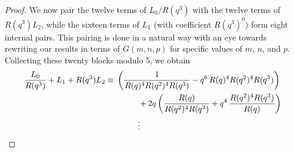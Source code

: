 \documentclass{amsart}
\theoremstyle{definition}
\def\myalpha{R(q)}
\def\mybeta{R(q^2)}
\def\mygamma{R(q^3)}
\begin{document}
\begin{proof}
We now pair the twelve terms of $L_0/\mygamma$ with the twelve terms of
$\mygamma L_2$, while the sixteen terms of $L_1$ (with coefficient $\mygamma^0$) form eight internal pairs. This pairing is done in a natural way with an eye towards rewriting our results in terms of $G(m,n,p)$ for specific values of $m$, $n$, and $p$. Collecting these twenty blocks modulo 5, we obtain
\begin{align}
\label{initial_pairings} 
\frac{L_0}{\mygamma}+L_1+\mygamma L_2 
& \equiv{}
\left(\frac{1}{\myalpha^{4}\mybeta^{4}\mygamma}-q^{6}\,\myalpha^{4}\mybeta^{4}\mygamma\right) \\
& \qquad\qquad +2q\left(\frac{\myalpha}{\mybeta^{4}\mygamma}+q^{4}\,\frac{\mybeta^{4}\mygamma}{\myalpha}\right) \notag\\
& \qquad\qquad  \vdots \notag\\

\end{align}
\end{proof}
\end{document}
